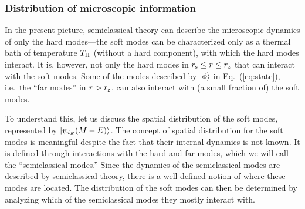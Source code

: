 \documentclass[12pt]{article}
\begin{document}
\subsubsection{Distribution of microscopic information}
\label{subsubsec:distr}

In the present picture, semiclassical theory can describe the 
microscopic dynamics of only the hard modes---the soft modes can 
be characterized only as a thermal bath of temperature $T_{\rm H}$ 
(without a hard component), with which the hard modes interact. 
It is, however, not only the hard modes in $r_{\rm s} \leq r \leq 
r_{\rm z}$ that can interact with the soft modes.  Some of the 
modes described by $| \phi \rangle$ in Eq.~(\ref{eq:state}), i.e.\ 
the ``far modes'' in $r > r_{\rm z}$, can also interact with (a 
small fraction of) the soft modes.

To understand this, let us discuss the spatial distribution of the 
soft modes, represented by $| \psi_{i_E}(M-E) \rangle$.  The concept 
of spatial distribution for the soft modes is meaningful despite 
the fact that their internal dynamics is not known.  It is 
defined through interactions with the hard and far modes, which 
we will call the ``semiclassical modes.''  Since the dynamics 
of the semiclassical modes are described by semiclassical theory, 
there is a well-defined notion of where these modes are located. 
The distribution of the soft modes can then be determined 
by analyzing which of the semiclassical modes they mostly 
interact with.
\end{document}
